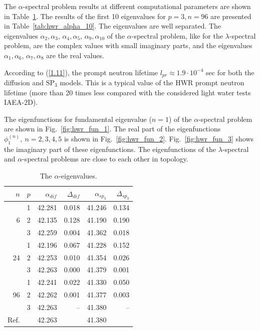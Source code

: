 \documentclass[authoryear]{elsarticle}
\begin{document}
The $\alpha$-spectral problem results at different computational parameters are shown in Table~\ref{tab:hwr_alpha}. 
The results of the first 10 eigenvalues for $p = 3, n = 96 $ are presented in Table~\ref{tab:hwr_alpha_10}.
The eigenvalues are well separated.
The eigenvalues $\alpha_2, \alpha_3$, $\alpha_4, \alpha_5$, $\alpha_9, \alpha_{10}$ of the $\alpha$-spectral problem, like for the $\lambda$-spectral problem, are the complex values with small imaginary parts, and the eigenvalues $\alpha_1, \alpha_6$, $\alpha_7, \alpha_8$ are the real values.

According to (\ref{1.11}), the prompt neutron lifetime $l_{pr} \approx 1.9 \cdot 10^{-4}$ sec for both the diffusion and $\mathrm{SP_3}$ models. This is a typical value of the HWR prompt neutron lifetime (more than 20 times less compared with the considered light water tests IAEA-2D).

The eigenfunctions for fundamental eigenvalue ($n=1$) of the $\alpha$-spectral problem  are shown in Fig.~\ref{fig:hwr_fun_1}.
The real part of the eigenfunctions $\phi^{(n)}_1, \ n = 2,3,4,5$ is shown in Fig.~\ref{fig:hwr_fun_2}.
Fig.~\ref{fig:hwr_fun_3} shows the imaginary part of these eigenfunctions.
The eigenfunctions of the $\lambda$-spectral and $\alpha$-spectral problems are close to each other in topology.

\begin{table}[h]
\caption{The $\alpha$-eigenvalues.}
\label{tab:hwr_alpha}
\begin{center}
\begin{tabular}{rrrrrr}
\hline
$n$ & $p$ & $\alpha_{dif}$ & $\Delta_{dif}$ &$\alpha_{sp_3}$& $\Delta_{sp_3}$ \\
\hline
	& 1	&42.281 & 0.018 & 41.246 & 0.134\\
6	& 2	&42.135 & 0.128 & 41.190 & 0.190\\
	& 3	&42.259 & 0.004 & 41.362 & 0.018\\ 
\hline
	& 1	&42.196 & 0.067 & 41.228 & 0.152\\
24& 2	&42.253 & 0.010 & 41.354 & 0.026\\
	& 3	&42.263 & 0.000 & 41.379 & 0.001\\ 
\hline
	& 1	&42.241 & 0.022 & 41.330 & 0.050\\
96& 2	&42.262 & 0.001 & 41.377 & 0.003\\
	& 3	&42.263 &    -- & 41.380 & -- \\ 
\hline
Ref.& & 42.263 & & 41.380 \\ 
\hline
\end{tabular}
\end{center}
\end{table}
\end{document}
